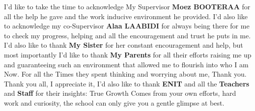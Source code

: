 \begin{acknowledgements}
 I'd like to take the time to acknowledge My Supervisor \textbf{Moez BOOTERAA} for all the help  he gave and the work inducive environment he provided. I'd also like to acknowledge my co-Supervisor \textbf{Alaa LAABIDI} for always being there for me to check my progress, helping  and all the encouragement and trust he puts in me. I'd also like to thank \textbf{My Sister} for her constant encouragement and help, but most importantly I'd like to thank \textbf{My Parents} for all their efforts raising me up and guaranteeing such an environment that allowed me to flourish into who I am Now. For all the Times they spent thinking and worrying about me, Thank you.\\Thank you all, I appreciate it, I'd also like to thank \textbf{ENIT} and all the \textbf{Teachers} and \textbf{Staff} for their insights: True Growth Comes from your own efforts, hard work and curiosity, the school can only give you a gentle glimpse at best.%
\end{acknowledgements}